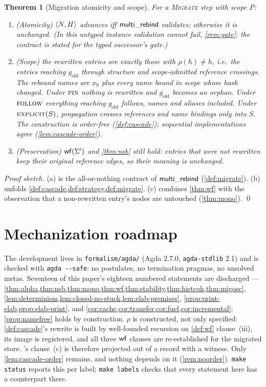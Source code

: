 \documentclass[11pt]{article}
\theoremstyle{definition}
\theoremstyle{plain}
\newtheorem{theorem}{Theorem}[section]
\theoremstyle{remark}
\begin{document}
\begin{theorem}[Migration atomicity and scope]\label{thm:migosc}
For a \textsc{Migrate} step with scope $P$:
\begin{enumerate}[nosep,label=(\alph*)]
  \item \emph{(Atomicity)} $\langle N,H\rangle$ advances iff $\mathsf{multi\_rebind}$ validates;
  otherwise it is unchanged. (In this untyped instance validation cannot fail,
  \cref{rem:gate}; the contract is stated for the typed successor's gate.)
  \item \emph{(Scope)} the rewritten entries are exactly those with $\rho(h) \neq h$, i.e.\ the
  entries reaching $g_{\mathrm{old}}$ through structure and scope-admitted reference
  crossings. The rebound names are $x_0$ plus every name bound in scope whose hash changed.
  Under $\textsc{pin}$ nothing is rewritten and $g_{\mathrm{old}}$ becomes an orphan. Under $\textsc{follow}$
  everything reaching $g_{\mathrm{old}}$ follows, names and aliases included. Under
  $\textsc{explicit}(S)$, propagation crosses references and name bindings only into $S$. The
  construction is order-free (\cref{def:cascade}); sequential implementations agree
  (\cref{lem:cascade-order}).
  \item \emph{(Preservation)} $\mathsf{wf}(\Sigma')$ and \cref{thm:nsb} still hold: entries that were
  not rewritten keep their original reference edges, so their meaning is unchanged.
\end{enumerate}
\end{theorem}
\begin{proof}[Proof sketch]
(a) is the all-or-nothing contract of $\mathsf{multi\_rebind}$ (\cref{def:migrate}). (b) unfolds
\cref{def:cascade,def:strategy,def:migrate}. (c) combines \cref{thm:wf} with the observation
that a non-rewritten entry's nodes are untouched (\cref{thm:mono}). \qed
\end{proof}

\section{Mechanization roadmap}\label{sec:mech}

The development lives in \texttt{formalism/agda/} (Agda 2.7.0, \texttt{agda-stdlib} 2.1) and is
checked with \texttt{agda -{}-safe}: no postulates, no termination pragmas, no unsolved metas.
Seventeen of this paper's eighteen numbered statements are discharged ---
\cref{thm:alpha,thm:nsb,thm:mono,thm:wf,thm:stability,thm:histcoh,thm:migosc},
\cref{lem:determinism,lem:closed-no-stuck,lem:elab-premises},
\cref{prop:print-elab,prop:elab-print}, and \cref{cor:cache,cor:transfer,cor:fuel,cor:incremental};
\cref{prop:namefree} holds by construction. $\rho$ is constructed, not only specified:
\cref{def:cascade}'s rewrite is built by well-founded recursion on \cref{def:wf} clause~(iii),
its image is registered, and all three $\mathsf{wf}$ clauses are re-established for the migrated store.
's clause~(c) is therefore projected out of a record with a witness. Only
\cref{lem:cascade-order} remains, and nothing depends on it (\cref{rem:noorder}).
\texttt{make status} reports this per label; \texttt{make labels} checks that every statement
here has a counterpart there.
\end{document}
